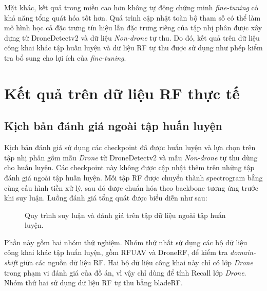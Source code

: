\documentclass[../DoAn.tex]{subfiles}
\begin{document}
Mặt khác, kết quả trong miền cao hơn không tự động chứng minh \textit{fine-tuning} có khả năng tổng quát hóa tốt hơn. Quá trình cập nhật toàn bộ tham số có thể làm mô hình học cả đặc trưng tín hiệu lẫn đặc trưng riêng của tập nhị phân được xây dựng từ DroneDetectv2 và dữ liệu \textit{Non-drone} tự thu. Do đó, kết quả trên dữ liệu công khai khác tập huấn luyện và dữ liệu RF tự thu được sử dụng như phép kiểm tra bổ sung cho lợi ích của \textit{fine-tuning}.

\section{Kết quả trên dữ liệu RF thực tế}

\subsection{Kịch bản đánh giá ngoài tập huấn luyện}

Kịch bản đánh giá sử dụng các checkpoint đã được huấn luyện và lựa chọn trên tập nhị phân gồm mẫu \textit{Drone} từ DroneDetectv2 và mẫu \textit{Non-drone} tự thu dùng cho huấn luyện. Các checkpoint này không được cập nhật thêm trên những tập đánh giá ngoài tập huấn luyện. Mỗi tập RF được chuyển thành spectrogram bằng cùng cấu hình tiền xử lý, sau đó được chuẩn hóa theo backbone tương ứng trước khi suy luận. Luồng đánh giá tổng quát được biểu diễn như sau:
\begin{figure}[htbp]
    \centering
    \caption{Quy trình suy luận và đánh giá trên tập dữ liệu ngoài tập huấn luyện.}
    \label{fig:inference-pipeline}
\end{figure}
Phần này gồm hai nhóm thử nghiệm. Nhóm thứ nhất sử dụng các bộ dữ liệu công khai khác tập huấn luyện, gồm RFUAV và DroneRF, để kiểm tra \textit{domain-shift} giữa các nguồn dữ liệu RF. Hai bộ dữ liệu công khai này chỉ có lớp \textit{Drone} trong phạm vi đánh giá của đồ án, vì vậy chỉ dùng để tính Recall lớp \textit{Drone}. Nhóm thứ hai sử dụng dữ liệu RF tự thu bằng bladeRF.
\end{document}
